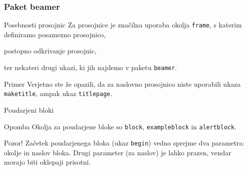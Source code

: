 
\begin{frame}
    \frametitle{Paket beamer}
\end{frame}

\begin{frame}{Posebnosti prosojnic}
    Za prosojnice je značilna uporaba okolja \texttt{frame}, 
    s katerim definiramo posamezno prosojnico,
    \pause %

    postopno odkrivanje prosojnic, 
    \pause %

    ter nekateri drugi ukazi, ki jih najdemo v paketu \texttt{beamer}.
    \pause %

    \begin{exampleblock}{Primer}
        Verjetno ste že opazili, da za naslovno prosojnico niste uporabili 
        ukaza \texttt{maketitle}, ampak ukaz \texttt{titlepage}.
    \end{exampleblock}
\end{frame}


	\begin{frame}{Poudarjeni bloki}
		\begin{block}{Opomba}
			Okolja za poudarjene bloke so \texttt{block}, \texttt{exampleblock} in \texttt{alertblock}.
		\end{block}
	
	    \begin{alertblock}{Pozor!}
			Začetek poudarjenega bloka (ukaz \texttt{begin}) vedno sprejme dva parametra:
			okolje in naslov bloka.
			Drugi parameter (za naslov) je lahko prazen, vendar morajo biti oklepaji prisotni.
		\end{alertblock}
	\end{frame}


